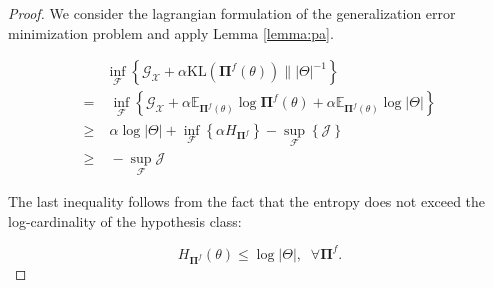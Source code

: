 \begin{proof}
    We consider the lagrangian formulation of the generalization error minimization problem 
    and apply Lemma \ref{lemma:pa}.

    $$
    \begin{aligned}
        & \inf_{\mathcal{F}} \left \{ \mathcal{G}_{\mathcal{X}} + \alpha \text{KL} (\mathbf{\Pi}^f(\theta)) \parallel |\Theta|^{-1} \right \} \\
        = & \; \inf_{\mathcal{F}} \left \{ \mathcal{G}_{\mathcal{X}} + \alpha \mathbb{E}_{\mathbf{\Pi}^f(\theta)} \log \mathbf{\Pi}^f(\theta) + \alpha \mathbb{E}_{\mathbf{\Pi}^f(\theta)} \log |\Theta| \right \} \\
        \geq & \; \alpha \log |\Theta| + \inf_{\mathcal{F}} \left \{ \alpha H_{\mathbf{\Pi}^f} \right \} - \sup_{\mathcal{F}} \left \{ \mathcal{J} \right \} \\
        \geq & \; - \sup_{\mathcal{F}} \mathcal{J}
    \end{aligned}
    $$

    The last inequality follows from the fact that the entropy does not exceed the log-cardinality
    of the hypothesis class:

    $$
    H_{\mathbf{\Pi}^f}(\theta) \leq \log |\Theta|, \;\; \forall \mathbf{\Pi}^f.
    $$
\end{proof}




